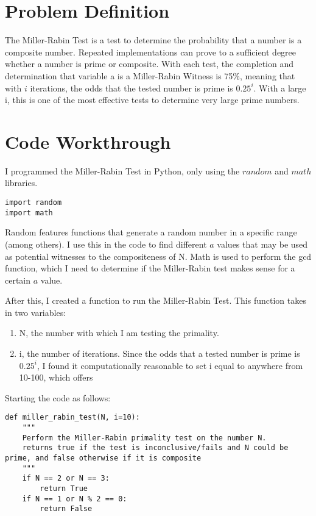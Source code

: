 \documentclass[11pt,a4paper]{article}
\begin{document}
\section{Problem Definition}

The Miller-Rabin Test is a test to determine the probability that a number is a composite number. Repeated implementations can prove to a sufficient degree whether a number is prime or composite. With each test, the completion and determination that variable a is a Miller-Rabin Witness is 75\%, meaning that with $i$ iterations, the odds that the tested number is prime is $0.25^{i}$. With a large i, this is one of the most effective tests to determine very large prime numbers. 

\section{Code Workthrough}

I programmed the Miller-Rabin Test in Python, only using the $random$ and $math$ libraries. 

\begin{lstlisting}
import random
import math
\end{lstlisting}

Random features functions that generate a random number in a specific range (among others). I use this in the code to find different $a$ values that may be used as potential witnesses to the compositeness of N. Math is used to perform the gcd function, which I need to determine if the Miller-Rabin test makes sense for a certain $a$ value. 

After this, I created a function to run the Miller-Rabin Test. This function takes in two variables:

\begin{enumerate}
    \item N, the number with which I am testing the primality.
    \item i, the number of iterations. Since the odds that a tested number is prime is $0.25^{i}$, I found it computationally reasonable to set i equal to anywhere from 10-100, which offers 
\end{enumerate}
    
Starting the code as follows: 

\vspace{3mm}

\begin{lstlisting}
def miller_rabin_test(N, i=10):
    """
    Perform the Miller-Rabin primality test on the number N.
    returns true if the test is inconclusive/fails and N could be prime, and false otherwise if it is composite
    """
    if N == 2 or N == 3:
        return True
    if N == 1 or N % 2 == 0:
        return False
\end{lstlisting}
\end{document}
